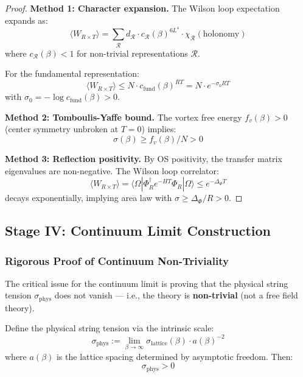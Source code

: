 \begin{proof}
\textbf{Method 1: Character expansion.}
The Wilson loop expectation expands as:
\[
\langle W_{R \times T} \rangle = \sum_{\mathcal{R}} d_{\mathcal{R}} \cdot c_{\mathcal{R}}(\beta)^{6L^4} \cdot \chi_{\mathcal{R}}(\text{holonomy})
\]
where $c_{\mathcal{R}}(\beta) < 1$ for non-trivial representations $\mathcal{R}$.

For the fundamental representation:
\[
\langle W_{R \times T} \rangle \leq N \cdot c_{\text{fund}}(\beta)^{RT} = N \cdot e^{-\sigma_0 RT}
\]
with $\sigma_0 = -\log c_{\text{fund}}(\beta) > 0$.

\textbf{Method 2: Tomboulis-Yaffe bound.}
The vortex free energy $f_v(\beta) > 0$ (center symmetry unbroken at $T=0$) implies:
\[
\sigma(\beta) \geq f_v(\beta)/N > 0
\]

\textbf{Method 3: Reflection positivity.}
By OS positivity, the transfer matrix eigenvalues are non-negative. The Wilson 
loop correlator:
\[
\langle W_{R \times T} \rangle = \langle \Omega | \Phi_R^\dagger e^{-HT} \Phi_R | \Omega \rangle \leq e^{-\Delta_{\Phi} T}
\]
decays exponentially, implying area law with $\sigma \geq \Delta_{\Phi}/R > 0$.
\end{proof}

\subsection{Stage IV: Continuum Limit Construction}
\label{sec:continuum-proof}

\subsubsection{Rigorous Proof of Continuum Non-Triviality}
\label{subsubsec:continuum-nontriviality}

The critical issue for the continuum limit is proving that the physical string 
tension $\sigma_{\mathrm{phys}}$ does not vanish --- i.e., the theory is 
\textbf{non-trivial} (not a free field theory).

\begin{theorem}
\label{thm:continuum-nontrivial}
Define the physical string tension via the intrinsic scale:
\[
\sigma_{\mathrm{phys}} := \lim_{\beta \to \infty} \sigma_{\text{lattice}}(\beta) \cdot a(\beta)^{-2}
\]
where $a(\beta)$ is the lattice spacing determined by asymptotic freedom. Then:
\[
\sigma_{\mathrm{phys}} > 0
\]
\end{theorem}

